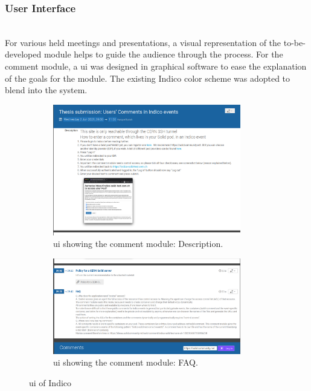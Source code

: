 \subsubsection{User Interface}\mbox{}\\

For various held meetings and presentations, a visual representation of the to-be-developed module helps to guide the audience through the process. For the comment module, a \gls{ui} was designed in graphical software to ease the explanation of the goals for the module. The existing Indico color scheme was adopted to blend into the system.

\begin{figure}
    \centering
    \begin{subfigure}{.5\textwidth}
      \centering
        \includegraphics[width=0.9\textwidth]{prototype/poc-solid-comment-description.png}
        \caption{\gls{ui} showing the comment module: Description.}
        \label{fig:poc-solid-comment-description}
    \end{subfigure}%
    \begin{subfigure}{.5\textwidth}
      \centering
    \includegraphics[width=0.9\textwidth]{prototype/poc-solid-comment-agenda.png}
    \caption{\gls{ui} showing the comment module: FAQ.}
    \label{fig:poc-solid-comment-agenda}
    \end{subfigure}
    \caption{\gls{ui} of Indico}
    \label{fig:test}
\end{figure}

